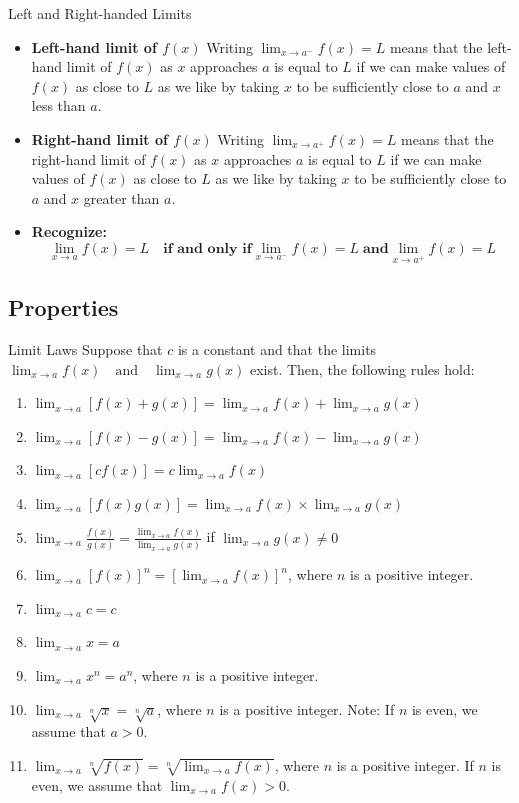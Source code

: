 \documentclass[]{beamer}
\begin{document}
    \begin{frame}{Left and Right-handed Limits}
        \begin{itemize}
            \item<2->\textbf{Left-hand limit of $f(x)$}
                Writing $\lim_{x \to a^-}f(x)=L$ means that the left-hand limit of $f(x)$ as $x$ approaches $a$ is equal to $L$ if we can make values of $f(x)$ as close to $L$ as we like by taking $x$ to be sufficiently close to $a$ and $x$ less than $a$. 

            \item<3->\textbf{Right-hand limit of $f(x)$}
Writing $\lim_{x \to a^+}f(x)=L$ means that the right-hand limit of $f(x)$ as $x$ approaches $a$ is equal to $L$ if we can make values of $f(x)$ as close to $L$ as we like by taking $x$ to be sufficiently close to $a$ and $x$ greater than $a$. 

        \item<4->\textbf{Recognize:}
            \[\lim_{x\to a} f(x) = L \quad \textbf{if and only if} \lim_{x \to a^-}f(x) = L \; \textbf{and} \lim_{x \to a^+}f(x)=L \]
        \end{itemize}
    \end{frame}
    \subsection{Properties}
    \begin{frame}{Limit Laws}
Suppose that $c$ is a constant and that the limits $\lim_{x\to a} f(x) \quad \text{and} \quad \lim_{x\to a} g(x)$ exist. Then, the following rules hold:
\begin{enumerate}
\item<2-> $\lim_{x\to a}[f(x) + g(x)] = \lim_{x\to a}f(x) + \lim_{x\to a}g(x) $
\item<3-> $\lim_{x\to a}[f(x) - g(x)] = \lim_{x\to a}f(x) - \lim_{x\to a}g(x) $
\item<4-> $\lim_{x\to a}[cf(x)] =  c\lim_{x\to a}f(x) $
\item<5-> $\lim_{x\to a}[f(x)g(x)] = \lim_{x\to a}f(x) \times \lim_{x\to a}g(x) $
\item<6-> $\displaystyle \lim_{x\to a}\frac{f(x)}{g(x)} = \frac{\displaystyle \lim_{x\to a}f(x)}{\displaystyle \lim_{x\to a}g(x)}$ if $\lim_{x\to a}g(x) \neq 0$
\item<7-> $\lim_{x\to a}[f(x)]^n = [\lim_{x\to a} f(x)]^n$, where $n$ is a positive integer.
\item<8-> $\lim_{x \to a} c = c$
\item<9-> $\lim_{x \to a} x = a$
\item<10-> $\lim_{x \to a} x^n = a^n$, where $n$ is a positive integer. 
\item<11-> $\lim_{x \to a} \sqrt[n]{x} = \sqrt[n]{a}$, where $n$ is a positive integer. Note: If $n$ is even, we assume that $a>0$. 
\item<12-> $\lim_{x \to a} \sqrt[n]{f(x)} = \displaystyle \sqrt[n]{\lim_{x \to a} f(x)}$, where $n$ is a positive integer. If $n$ is even, we assume that $\lim_{x \to a} f(x) >0$. 
\end{enumerate}
\end{frame}
\end{document}
